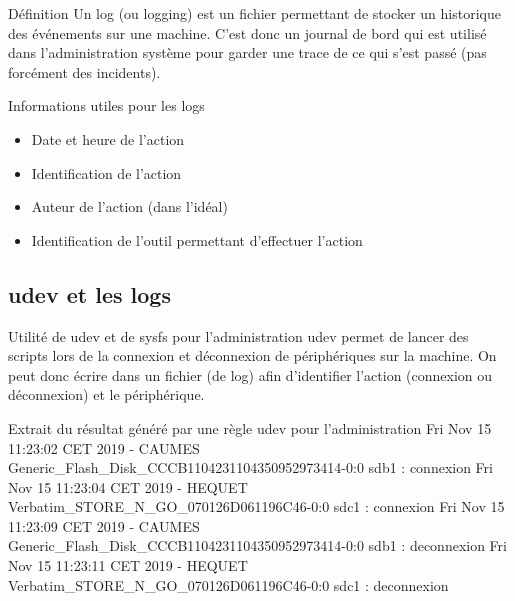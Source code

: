 \documentclass{beamer}
\begin{document}
\begin{frame}
\begin{block}{Définition} 
	Un log (ou logging) est un fichier permettant de stocker un historique des événements sur une machine. C'est donc un journal de bord qui est utilisé dans l'administration système pour garder une trace de ce qui s'est passé (pas forcément des incidents).
\end{block}


\begin{alertblock}{Informations utiles pour les logs}
	\begin{itemize}
		[circle]
		\item Date et heure de l'action
		\item Identification de l'action 
		\item Auteur de l'action (dans l'idéal)
		\item Identification de l'outil permettant d'effectuer l'action
	\end{itemize}
\end{alertblock}
\end{frame}

\subsection{udev et les logs}
\begin{frame}
\begin{block}{Utilité de udev et de sysfs pour l'administration} 
	udev permet de lancer des scripts lors de la connexion et déconnexion de périphériques sur la machine. \newline On peut donc écrire dans un fichier (de log) afin d'identifier l'action (connexion ou déconnexion) et le périphérique. 
\end{block}


\begin{exampleblock}{Extrait du résultat généré par une règle udev pour l'administration}
	\tiny{
		Fri Nov 15 11:23:02 CET 2019 - CAUMES Generic\_Flash\_Disk\_CCCB1104231104350952973414-0:0 sdb1 : connexion \newline
		Fri Nov 15 11:23:04 CET 2019 - HEQUET Verbatim\_STORE\_N\_GO\_070126D061196C46-0:0 sdc1 : connexion \newline
		Fri Nov 15 11:23:09 CET 2019 - CAUMES Generic\_Flash\_Disk\_CCCB1104231104350952973414-0:0 sdb1 : deconnexion \newline
		Fri Nov 15 11:23:11 CET 2019 - HEQUET Verbatim\_STORE\_N\_GO\_070126D061196C46-0:0 sdc1 : deconnexion \newline
	}
\end{exampleblock}
\end{frame}
\end{document}
